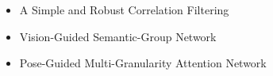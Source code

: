 \begin{itemize}
    \item A Simple and Robust Correlation Filtering
    \cite{Suo_ECCV_A}
    \item Vision-Guided Semantic-Group Network 
    \cite{he2023vgsg}
    \item Pose-Guided Multi-Granularity Attention Network
    \cite{jing2019poseguided}
\end{itemize}
